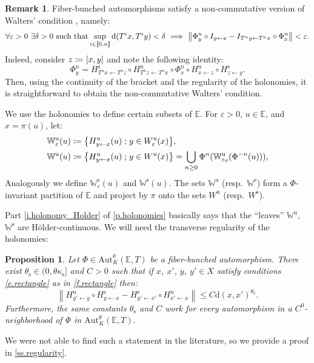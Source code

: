 \documentclass[10pt]{amsart}
\newcommand{\ldbrack}{[\![}
\newcommand{\rdbrack}{]\!]}
\def\vcentcolon{\mathrel{\mathop\ordinarycolon}}
\providecommand\ordinarycolon{:}
\providecommand*\coloneqq{\vcentcolon\mathrel{\mkern-1.2mu}=}
\newcommand\implique{\mathchoice{\Longrightarrow}{\Rightarrow}{\Rightarrow}{\Rightarrow}}
\theoremstyle{plain}
\newtheorem{proposition}[theorem]{Proposition}
\theoremstyle{definition}
\newtheorem{remark}[theorem]{Remark}
\newcommand{\EE}{\mathbb{E}}
\newcommand{\WW}{\mathbb{W}}
\newcommand{\st}{\;\mathord{;}\;}
\newcommand{\dd}{\mathrm{d}}
\newcommand{\uu}{\mathrm{u}}
\renewcommand{\ss}{\mathrm{s}}
\newcommand{\Aut}{\mathrm{Aut}}
\let\epsilon\varepsilon
\begin{document}
\begin{remark}
Fiber-bunched automorphisms satisfy a non-commutative version of Walters' condition \cite{Bousch_Walters}, namely:
\[
\forall \epsilon>0 \ \exists \delta> 0 \ \text{such that} \sup_{i \in \ldbrack 0,n \rdbrack} \dd(T^i x, T^i y) < \delta \ \implique \ \big\| \Phi_y^n \circ I_{y \gets x} - I_{T^n y \gets T^n x} \circ \Phi_x^n \big\| < \epsilon.
\]
Indeed, consider $z \coloneqq [x,y]$ and note the following identity:
\[
\Phi_y^n = H^\ss_{T^n x \gets T^n z} \circ H^\uu_{T^n z \gets T^n x} \circ \Phi^n_x \circ H^\uu_{x \gets z} \circ H^\ss_{z \gets y}.
\]
Then, using the continuity of the bracket and the regularity of the holonomies, it is straightforward to obtain the non-commutative Walters' condition.
\end{remark}

We use the holonomies to define certain subsets of $\EE$.
For $\epsilon>0$, $u \in \EE$, and $x = \pi(u)$, let:
\begin{align*}
\WW^\uu_\epsilon(u)	&\coloneqq \big\{ H^\uu_{y \gets x}(u) \st y \in W^\uu_\epsilon(x) \big\}, \\
\WW^\uu(u)			&\coloneqq \big\{ H^\uu_{y \gets x}(u) \st y \in W^\uu(x) \big\}
= \bigcup_{n\ge 0} \Phi^n(\WW^\uu_{\epsilon_0}(\Phi^{-n}(u))),
\end{align*}
Analogously we define $\WW^\ss_\epsilon(u)$ and $\WW^\ss(u)$.
The sets $\WW^\uu$ (resp.\ $\WW^\ss$) form a $\Phi$-invariant partition of $\EE$ and project by $\pi$ onto the sets $W^\uu$ (resp.\ $W^\ss$).

Part \eqref{i.holonomy_Holder} of \cref{p.holonomies} basically says that the ``leaves'' $\WW^\uu$, $\WW^\ss$ are Hölder-continuous.
We will need the transverse regularity of the holonomies:

\begin{proposition}\label{p.regularity_above}
Let	$\Phi \in \Aut^\theta_K(\EE,T)$ be a fiber-bunched automorphism.
There exist $\theta_\ss \in (0,\theta \kappa_\ss]$ and $C>0$ such that
if $x$, $x'$, $y$, $y' \in X$ satisfy conditions \eqref{e.rectangle} as in \cref{f.rectangle}
then:
\[
\left\| H^\uu_{y' \gets y} \circ H^\ss_{y \gets x} - H^\ss_{y' \gets x'} \circ H^\uu_{x'\gets x} \right\|
\le C \dd(x,x')^{\theta_\ss}.
\]
Furthermore, the same constants $\theta_\ss$ and $C$ work for every automorphism in a $C^0$-neighborhood of $\Phi$ in $\Aut^\theta_K(\EE,T)$.
\end{proposition}

We were not able to find such a statement in the literature,
so we provide a proof in \cref{ss.regularity}.
\end{document}
